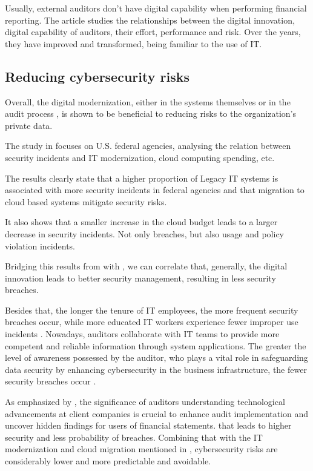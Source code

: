\documentclass[journal]{IEEEtran}
\begin{document}
Usually, external auditors don't have digital capability when performing financial reporting. The article \cite{bastos_2} studies the relationships between the digital innovation, digital capability of auditors, their effort, performance and risk. 
Over the years, they have improved and transformed, being familiar to the use of IT. 


\subsection{Reducing cybersecurity risks}

Overall, the digital modernization, either in the systems themselves \cite{bastos_1} or in the audit process \cite{bastos_2}, is shown to be beneficial to reducing risks to the organization's private data. 

The study in \cite{bastos_1} focuses on U.S. federal agencies, analysing the relation between security incidents and IT modernization, cloud computing spending, etc. 

The results clearly state that a higher proportion of Legacy IT systems is associated with more security incidents in federal agencies and that migration to cloud based systems mitigate security risks. 

It also shows that a smaller increase in the cloud budget leads to a larger decrease in security incidents. Not only breaches, but also usage and policy violation incidents.

Bridging this results from \cite{bastos_1} with \cite{bastos_2}, we can correlate that, generally, the digital innovation leads to better security management, resulting in less security breaches.

Besides that, the longer the tenure of IT employees, the more frequent security breaches occur, while more educated IT workers experience fewer improper use incidents \cite{bastos_1}. Nowadays, auditors collaborate with IT teams to provide more competent and reliable information through system applications. The greater the level of awareness possessed by the auditor, who plays a vital role in safeguarding data security by enhancing cybersecurity in the business infrastructure, the fewer security breaches occur \cite{bastos_2}.

As emphasized by \cite{bastos_2}, the significance of auditors understanding technological advancements at client companies is crucial to enhance audit implementation and uncover hidden findings for users of financial statements. that leads to higher security and less probability of breaches. Combining that with the IT modernization and cloud migration mentioned in \cite{bastos_1}, cybersecurity risks are considerably lower and more predictable and avoidable.
\end{document}
